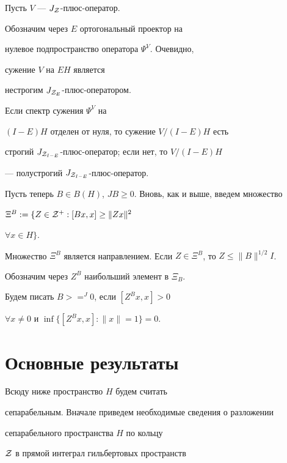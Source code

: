 \begin{note}


Пусть $V$ --- $J_{\cal Z}$-плюс-оператор.


Обозначим через $E$ ортогональный проектор на


нулевое подпространство оператора $\Psi^{V}$. Очевидно, 


сужение $V$ на $EH$ является


нестрогим $J_{{\cal Z}_{E}}$-плюс-оператором. 


Если спектр сужения $\Psi^{V}$ на


$(I-E)H$ отделен от нуля, то сужение $V/(I-E)H$ есть


строгий $J_{{\cal Z}_{I-E}}$-плюс-оператор; если нет, то $V/(I-E)H$ 


--- полустрогий $J_{{\cal Z}_{I-E}}$-плюс-оператор.


\end{note}





Пусть теперь $B\in B(H)$, $JB\geq 0$. Вновь, как и выше, введем множество


$\Xi^{B}:=\{Z\in {\cal Z}^{+}: [Bx,x]\geq \| Zx\|^{2}$


$\forall x\in H\}$.


Множество $\Xi^{B}$ является направлением. Если $Z\in


\Xi^{B}$, то $Z\leq\| B\|^{1/2} I$.


Обозначим через $Z^{B}$ наибольший элемент в $\Xi_{B}$.


Будем писать $B>=^{J}0$, если $[Z^{B}x,x]>0$


$\forall x\ne 0$ и $\inf\{[Z^{B}x,x]:\| x\|=1\}=0$.








\section*{Основные результаты}





Всюду ниже пространство $H$ будем считать


сепарабельным. Вначале приведем необходимые сведения о разложении 


сепарабельного пространства $H$ по кольцу


${\cal Z}$ в прямой интеграл гильбертовых пространств


